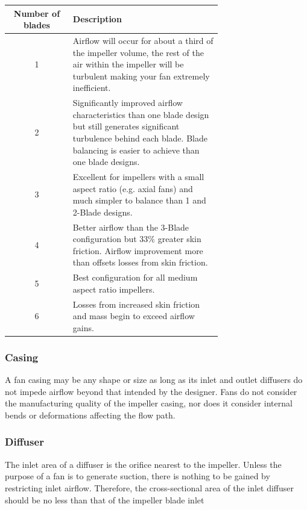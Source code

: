 \begin{table}[ht]
  \begin{center}
    \leavevmode
     \begin{tabular}{|c | p{0.7\linewidth}|}\hline
     Number of blades & Description \\ \hline
      1 & Airflow will occur for about a third of the impeller volume, the rest of the air within the impeller will be turbulent making your fan extremely inefficient. \\
      \hline
      2 & Significantly improved airflow characteristics than one blade design but still generates significant turbulence behind each blade. Blade balancing is easier to achieve than one blade designs. \\
      \hline
      3 & Excellent for impellers with a small aspect ratio (e.g. axial fans) and much simpler to balance than 1 and 2-Blade designs. \\
      \hline
      4 & Better airflow than the 3-Blade configuration but 33\% greater skin friction. Airflow improvement more than offsets losses from skin friction. \\
      \hline
      5 & Best configuration for all medium aspect ratio impellers. \\
      \hline
      6 & Losses from increased skin friction and mass begin to exceed airflow gains. \\ \hline
    \end{tabular}
    \label{table:2}
  \end{center}
\end{table}


\subsubsection{Casing}

A fan casing may be any shape or size as long as its inlet and outlet diffusers do not impede airflow beyond that intended by the designer. Fans do not consider the manufacturing quality of the impeller casing, nor does it consider internal bends or deformations affecting the flow path.

\subsubsection{Diffuser}

The inlet area of a diffuser is the orifice nearest to the impeller. Unless the purpose of a fan is to generate suction, there is nothing to be gained by restricting inlet airflow. Therefore, the cross-sectional area of the inlet diffuser should be no less than that of the impeller blade inlet

